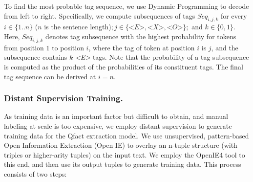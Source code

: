 To find the most probable tag sequence, we use Dynamic Programming to decode from left to right. Specifically, we compute subsequences of tags $\textit{Seq}_{i,j,k}$ for every $i \in \{1..n\}$ ($n$ is the sentence length)$; j \in \{\textit{<E>}, \textit{<X>}, \textit{<O>}\};$ and $k \in \{0, 1\}$. Here, $\textit{Seq}_{i,j,k}$ denotes tag subsequence with the highest probability for tokens from position $1$ to position $i$, where the tag of token at position $i$ is $j$, and the subsequence contains $k$ \textit{<E>} tags.
Note that the probability of a tag subsequence is computed as the product of the probabilities of its constituent tags. 
The final tag sequence can be derived at $i = n$.




\subsubsection{Distant Supervision Training.} As training data is an important factor but difficult to obtain, and manual labeling 
at scale is too 
expensive, we employ distant supervision to generate training data for the Qfact extraction model.
We use unsupervised, pattern-based Open Information Extraction (Open IE) to overlay an n-tuple structure
(with triples or higher-arity tuples) 
on the input text. 
We employ the OpenIE4 tool \cite{DBLP:conf/ijcai/Mausam16} to this end, and then use its output tuples
to generate training data. This process consists of two steps:\\

